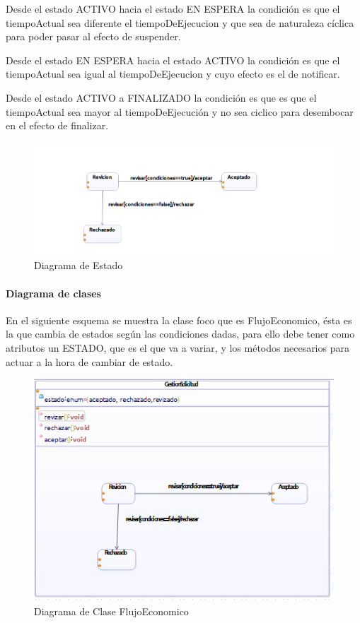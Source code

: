Desde el estado ACTIVO hacia el estado EN ESPERA la condición es que el tiempoActual sea diferente el tiempoDeEjecucion y que sea de naturaleza cíclica para poder pasar al efecto de suspender.

Desde el estado EN ESPERA hacia el estado ACTIVO la condición es que el tiempoActual sea igual al tiempoDeEjecucion y cuyo efecto es el de notificar.

Desde el estado ACTIVO a FINALIZADO la condición es que es que el tiempoActual sea mayor al tiempoDeEjecución y no sea ciclico para desembocar en el efecto de finalizar.

\begin{figure}[H]
	\centering
	\includegraphics[width=1\linewidth]{parte2/imgs/DiagramaDeEstado/estados}
	\caption{Diagrama de Estado}
	\label{fig:diagramaEstado}
\end{figure}

\paragraph{Diagrama de clases} 

En el siguiente esquema se muestra la clase foco que es FlujoEconomico, ésta es la que cambia de estados según las condiciones dadas, para ello debe tener como atributos un ESTADO, que es el que va a variar, y los métodos necesarios para actuar a la hora de cambiar de estado.

\begin{figure}[H]
	\centering
	\includegraphics[width=1\linewidth]{parte2/imgs/DiagramaDeEstado/claseEstados}
	\caption{Diagrama de Clase FlujoEconomico}
	\label{fig:diagramaEstadoClase}
\end{figure}


